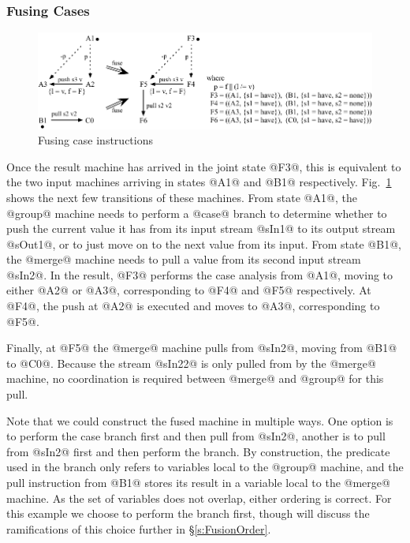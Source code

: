 \subsubsection{Fusing Cases}
\begin{figure}
\includegraphics[scale=1.1]{figures/fuse-case-pull.pdf}
\caption{Fusing case instructions}
\label{fig:Fusion:Case}
\end{figure}

Once the result machine has arrived in the joint state @F3@, this is equivalent to the two input machines arriving in states @A1@ and @B1@ respectively.
Fig.~\ref{fig:Fusion:Case} shows the next few transitions of these machines.
From state @A1@, the @group@ machine needs to perform a @case@ branch to determine whether to push the current value it has from its input stream @sIn1@ to its output stream @sOut1@, or to just move on to the next value from its input. From state @B1@, the @merge@ machine needs to pull a value from its second input stream @sIn2@. In the result, @F3@ performs the case analysis from @A1@, moving to either @A2@ or @A3@, corresponding to @F4@ and @F5@ respectively.
At @F4@, the push at @A2@ is executed and moves to @A3@, corresponding to @F5@.

Finally, at @F5@ the @merge@ machine pulls from @sIn2@, moving from @B1@ to @C0@.
Because the stream @sIn22@ is only pulled from by the @merge@ machine, no coordination is required between @merge@ and @group@ for this pull.

Note that we could construct the fused machine in multiple ways. One option is to perform the case branch first and then pull from @sIn2@, another is to pull from @sIn2@ first and then perform the branch. By construction, the predicate used in the branch only refers to variables local to the @group@ machine, and the pull instruction from @B1@ stores its result in a variable local to the @merge@ machine. As the set of variables does not overlap, either ordering is correct. For this example we choose to perform the branch first, though will discuss the ramifications of this choice further in \S\ref{s:FusionOrder}. 


